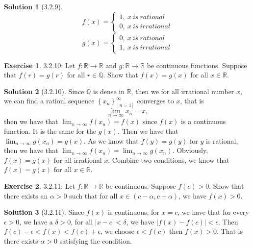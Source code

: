 \documentclass{article}
\theoremstyle{definition}
\newtheorem{exe}{Exercise}[section]
\newtheorem{sol}{Solution}[exe]
\begin{document}
\begin{sol}[3.2.9]
$$f(x)=\begin{cases}
    1,\ x\ is\ rational\\
    0,\ x\ is\ irrational
\end{cases}$$$$
g(x)=\begin{cases}
    0,\ x\ is\ rational\\
    1,\ x\ is\ irrational
\end{cases}$$
\end{sol}


\begin{exe} 3.2.10: Let \( f: \mathbb{R} \rightarrow \mathbb{R} \) and \( g: \mathbb{R} \rightarrow \mathbb{R} \) be continuous functions. Suppose that \( f(r) = g(r) \) for all \( r \in \mathbb{Q} \). Show that \( f(x) = g(x) \) for all \( x \in \mathbb{R} \).

\end{exe}

\begin{sol}[3.2.10]
    Since $\mathbb{Q}$ is dense in $\mathbb{R}$, then we for all irrational number $x$, we can find a rationl sequence $\left\{x_n\right\}_[n=1]^{\infty}$ converges to $x$, that is  
    $$\lim_{n\to\infty}x_n=x,$$
    then we have that $\lim_{n\to\infty} f(x_n) = f(x)$ since $f(x)$ is a continuous function. It is the same for the $g(x)$. Then we have that $\lim_{n\to\infty}g(x_n)=g(x)$. 
    As we know that $f(y)=g(y)$ for $y$ is rational, then we have that $\lim_{n\to\infty}f(x_n)=\lim_{n\to\infty}g(x_n)$. Obviously, $f(x)=g(x)$ for all irrational $x$. Combine two conditions, we know that 
    $f(x)=g(x)$ for all $x\in\mathbb{R}$.
\end{sol}


\begin{exe} 3.2.11: Let \( f: \mathbb{R} \rightarrow \mathbb{R} \) be continuous. Suppose \( f(c) > 0 \). Show that there exists an \( \alpha > 0 \) such that for all \( x \in (c - \alpha, c + \alpha) \), we have \( f(x) > 0 \).

\end{exe}

\begin{sol}[3.2.11]
Since $f(x)$ is continuous, for $x=c$, we have that for every $\epsilon>0$, we have a $\delta>0$, for all $|x-c|<\delta$, we have $|f(x)-f(c)|<\epsilon$. Then $f(c)-\epsilon<f(x)<f(c)+\epsilon$, we choose $\epsilon<f(c)$ then $f(x)>0$. That is there exists $\alpha>0$ satisfying the condition.
\end{sol}
\end{document}

